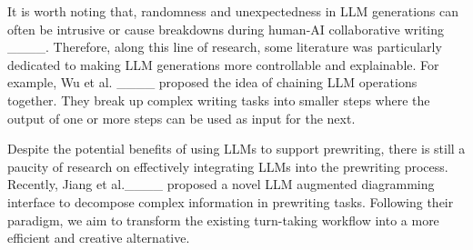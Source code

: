
It is worth noting that, randomness and unexpectedness in LLM generations can often be intrusive or cause breakdowns during human-AI collaborative writing ____. Therefore, along this line of research, some literature was particularly dedicated to making LLM generations more controllable and explainable. For example, Wu et al. ____ proposed the idea of chaining LLM operations together. They break up complex writing tasks into smaller steps where the output of one or more steps can be used as input for the next.

Despite the potential benefits of using LLMs to support prewriting, there is still a paucity of research on effectively integrating LLMs into the prewriting process.
Recently, Jiang et al.____ proposed a novel LLM augmented diagramming interface to decompose complex information in prewriting tasks.
Following their paradigm, we aim to transform the existing turn-taking workflow into a more efficient and creative alternative. 